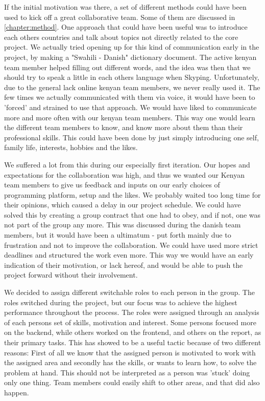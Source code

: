 If the initial motivation was there, a set of different methods could have been used to kick off a great collaborative team. Some of them are discussed in \ref{chapter:method}. One approach that could have been useful was to introduce each others countries and talk about topics not directly related to the core project. We actually tried opening up for this kind of communication early in the project, by making a "Swahili - Danish" dictionary document. The active kenyan team member helped filling out different words, and the idea was then that we should try to speak a little in each others language when Skyping. Unfortunately, due to the general lack online kenyan team members, we never really used it. The few times we actually communicated with them via voice, it would have been to 'forced' and strained to use that approach. We would have liked to communicate more and more often with our kenyan team members. This way one would learn the different team members to know, and know more about them than their professional skills. This could have been done by just simply introducing one self, family life, interests, hobbies and the likes.

We suffered a lot from this during our especially first iteration. Our hopes and expectations for the collaboration was high, and thus we wanted our Kenyan team members to give us feedback and inputs on our early choices of programming platform, setup and the likes. We probably waited too long time for their opinions, which caused a delay in our project schedule. We could have solved this by creating a group contract that one had to obey, and if not, one was not part of the group any more. This was discussed during the danish team members, but it would have been a ultimatum - put forth mainly due to frustration and not to improve the collaboration. We could have used more strict deadlines and structured the work even more. This way we would have an early indication of their motivation, or lack hereof, and would be able to push the project forward without their involvement. 

We decided to assign different switchable roles to each person in the group. The roles switched during the project, but our focus was to achieve the highest performance throughout the process. The roles were assigned through an analysis of each persons set of skills, motivation and interest. Some persons focused more on the backend, while others worked on the frontend, and others on the report, as their primary tasks. This has showed to be a useful tactic because of two different reasons: First of all we know that the assigned person is motivated to work with the assigned area and secondly has the skills, or wants to learn how, to solve the problem at hand. This should not be interpreted as a person was 'stuck' doing only one thing. Team members could easily shift to other areas, and that did also happen.

